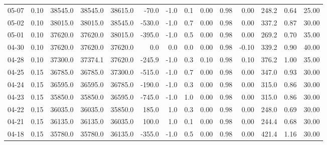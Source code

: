 \begin{threeparttable}
{\begin{tabular}{lrrrrrrrrrrrrr}
  05-07 &     0.10 & 38545.0 & 38545.0 & 38615.0 &      -70.0 &                     -1.0 &                 0.1 &       0.00 &      0.98 &           0.00 &            248.2 &            0.64 &                  25.00 \\
  05-02 &     0.10 & 38015.0 & 38015.0 & 38545.0 &     -530.0 &                     -1.0 &                 0.7 &       0.00 &      0.98 &           0.00 &            337.2 &            0.87 &                  30.00 \\
  05-01 &     0.10 & 37620.0 & 37620.0 & 38015.0 &     -395.0 &                     -1.0 &                 0.5 &       0.00 &      0.98 &           0.00 &            269.2 &            0.70 &                  35.00 \\
  04-30 &     0.10 & 37620.0 & 37620.0 & 37620.0 &        0.0 &                      0.0 &                 0.0 &       0.00 &      0.98 &          -0.10 &            339.2 &            0.90 &                  40.00 \\
  04-28 &     0.10 & 37300.0 & 37374.1 & 37620.0 &     -245.9 &                     -1.0 &                 0.3 &       0.10 &      0.98 &           0.10 &            376.2 &            1.00 &                  35.00 \\
  04-25 &     0.15 & 36785.0 & 36785.0 & 37300.0 &     -515.0 &                     -1.0 &                 0.7 &       0.00 &      0.98 &           0.00 &            347.0 &            0.93 &                  30.00 \\
  04-24 &     0.15 & 36595.0 & 36595.0 & 36785.0 &     -190.0 &                     -1.0 &                 0.3 &       0.00 &      0.98 &           0.00 &            315.0 &            0.86 &                  30.00 \\
  04-23 &     0.15 & 35850.0 & 35850.0 & 36595.0 &     -745.0 &                     -1.0 &                 1.0 &       0.00 &      0.98 &           0.00 &            315.0 &            0.86 &                  30.00 \\
  04-22 &     0.15 & 36035.0 & 36035.0 & 35850.0 &      185.0 &                      1.0 &                 0.3 &       0.00 &      0.98 &           0.00 &            248.0 &            0.69 &                  30.00 \\
  04-21 &     0.15 & 36135.0 & 36135.0 & 36035.0 &      100.0 &                      1.0 &                 0.1 &       0.00 &      0.98 &           0.00 &            244.4 &            0.68 &                  30.00 \\
  04-18 &     0.15 & 35780.0 & 35780.0 & 36135.0 &     -355.0 &                     -1.0 &                 0.5 &       0.00 &      0.98 &           0.00 &            421.4 &            1.16 &                  30.00 \\

\end{tabular}}
\end{threeparttable}
